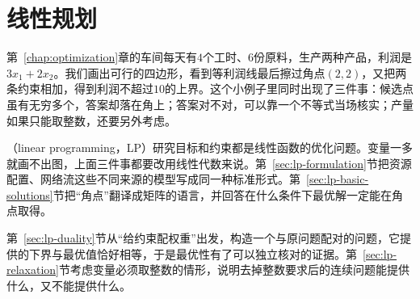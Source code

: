 \chapter{线性规划}
\label{chap:linear-programming}

第~\ref{chap:optimization}章的车间每天有$4$个工时、$6$份原料，生产两种产品，利润是$3x_1+2x_2$。我们画出可行的四边形，看到等利润线最后擦过角点$(2,2)$，又把两条约束相加，得到利润不超过$10$的上界。这个小例子里同时出现了三件事：候选点虽有无穷多个，答案却落在角上；答案对不对，可以靠一个不等式当场核实；产量如果只能取整数，还要另外考虑。

（linear programming，LP）研究目标和约束都是线性函数的优化问题。变量一多就画不出图，上面三件事都要改用线性代数来说。第~\ref{sec:lp-formulation}节把资源配置、网络流这些不同来源的模型写成同一种标准形式。第~\ref{sec:lp-basic-solutions}节把“角点”翻译成矩阵的语言，并回答在什么条件下最优解一定能在角点取得。

第~\ref{sec:lp-duality}节从“给约束配权重”出发，构造一个与原问题配对的问题，它提供的下界与最优值恰好相等，于是最优性有了可以独立核对的证据。第~\ref{sec:lp-relaxation}节考虑变量必须取整数的情形，说明去掉整数要求后的连续问题能提供什么，又不能提供什么。






